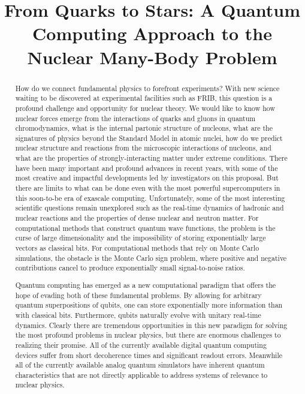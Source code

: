 \documentclass[11pt]{article}
\begin{document}
\title{From Quarks to Stars:  A Quantum Computing Approach to the Nuclear Many-Body Problem}

\maketitle

\begin{abstract}
  
How do we connect fundamental physics to forefront experiments?  With
new science waiting to be discovered at experimental facilities such
as FRIB, this question is a profound challenge and opportunity for
nuclear theory.  We would like to know how nuclear forces emerge from
the interactions of quarks and gluons in quantum chromodynamics, what
is the internal partonic structure of nucleons, what are the
signatures of physics beyond the Standard Model in atomic nuclei, how
do we predict nuclear structure and reactions from the microscopic
interactions of nucleons, and what are the properties of
strongly-interacting matter under extreme conditions.  There have been
many important and profound advances in recent years, with some of the
most creative and impactful developments led by investigators on this
proposal.  But there are limits to what can be done even with the most
powerful supercomputers in this soon-to-be era of exascale computing.
Unfortunately, some of the most interesting scientific questions
remain unexplored such as the real-time dynamics of hadronic and
nuclear reactions and the properties of dense nuclear and neutron
matter. For computational methods that construct quantum wave
functions, the problem is the curse of large dimensionality and the
impossibility of storing exponentially large vectors as classical
bits.  For computational methods that rely on Monte Carlo simulations,
the obstacle is the Monte Carlo sign problem, where positive and
negative contributions cancel to produce exponentially small signal-to-noise ratios.

Quantum computing has emerged as a new computational paradigm that
offers the hope of evading both of these fundamental problems.  By
allowing for arbitrary quantum superpositions of
qubits, one can store exponentially more information than with classical
bits.  Furthermore, qubits naturally evolve with unitary real-time
dynamics. Clearly there are tremendous opportunities in this new
paradigm for solving the most profound problems in nuclear physics,
but there are enormous challenges to realizing their promise.  All of the currently available digital quantum computing devices suffer from short decoherence times and significant readout errors.
Meanwhile all of the currently available
analog quantum simulators have inherent quantum characteristics that
are not directly applicable to address systems of relevance to nuclear
physics.


\end{abstract}
\end{document}
